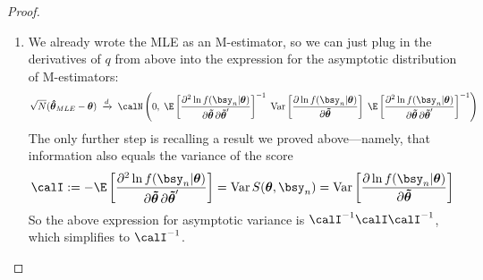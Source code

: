 \documentclass[12pt]{article}
\theoremstyle{plain}
\theoremstyle{definition}
\theoremstyle{remark}
\newcommand{\bstheta}{\boldsymbol{\theta}}
\newcommand{\bshattheta}{\boldsymbol{\hat{\theta}}}
\newcommand{\bstildetheta}{\boldsymbol{\tilde{\theta}}}
\newcommand{\Var}{\operatorname{Var}}
\newcommand{\dto}{\xrightarrow{d}}
\begin{document}
\begin{proof}
\begin{enumerate}[label=(\roman*)]
  \item
    We already wrote the MLE as an M-estimator, so we can just plug in
    the derivatives of $q$ from above into the expression for the
    asymptotic distribution of M-estimators:
    \begin{align*}
      \sqrt{N}(\bshattheta_{MLE}-\bstheta)
      \;\dto\;
      \calN\left(0,\;
      \E\left[
      \frac{\partial^2 \ln f(\bsy_n|\bstheta)}{%
        \partial\bstildetheta\,\partial\bstildetheta'}
      \right]^{-1}
      \;
      \Var\left[
        \frac{\partial \ln f(\bsy_n|\bstheta)}{\partial \bstildetheta}
      \right]
      \;
      \E\left[
      \frac{\partial^2 \ln f(\bsy_n|\bstheta)}{%
        \partial\bstildetheta\,\partial\bstildetheta'}
      \right]^{-1}
      \right)
    \end{align*}
    The only further step is recalling a result we proved
    above---namely, that information also equals the variance of the
    score
    \begin{align*}
      \calI
      := -\E\left[
        \frac{\partial^2 \ln f(\bsy_n|\bstheta)}{%
          \partial \bstildetheta \,\partial \bstildetheta'}
        \right]
      =
      \Var S(\bstheta,\bsy_n)
      = \Var\left[
        \frac{\partial \ln f(\bsy_n|\bstheta)}{%
          \partial \bstildetheta}
        \right]
    \end{align*}
    So the above expression for asymptotic variance is
    $\calI^{-1}\calI\calI^{-1}$, which simplifies to $\calI^{-1}$.
\end{enumerate}
\end{proof}

\end{document}
